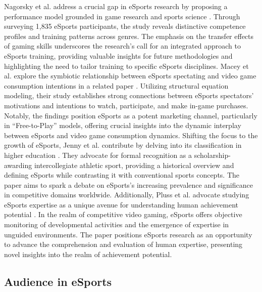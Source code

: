 \documentclass[manuscript,screen,review,anonymous]{acmart}
\begin{document}
Nagorsky et al. address a crucial gap in eSports research by proposing a performance model grounded in game research and sports science \cite{a14}. Through surveying 1,835 eSports participants, the study reveals distinctive competence profiles and training patterns across genres. The emphasis on the transfer effects of gaming skills underscores the research's call for an integrated approach to eSports training, providing valuable insights for future methodologies and highlighting the need to tailor training to specific eSports disciplines. Macey et al. explore the symbiotic relationship between eSports spectating and video game consumption intentions in a related paper \cite{a11}. Utilizing structural equation modeling, their study establishes strong connections between eSports spectators' motivations and intentions to watch, participate, and make in-game purchases. Notably, the findings position eSports as a potent marketing channel, particularly in ``Free-to-Play'' models, offering crucial insights into the dynamic interplay between eSports and video game consumption dynamics. Shifting the focus to the growth of eSports, Jenny et al. contribute by delving into its classification in higher education \cite{a6}. They advocate for formal recognition as a scholarship-awarding intercollegiate athletic sport, providing a historical overview and defining eSports while contrasting it with conventional sports concepts. The paper aims to spark a debate on eSports's increasing prevalence and significance in competitive domains worldwide. Additionally, Pluss et al. advocate studying eSports expertise as a unique avenue for understanding human achievement potential \cite{a17}. In the realm of competitive video gaming, eSports offers objective monitoring of developmental activities and the emergence of expertise in unguided environments. The paper positions eSports research as an opportunity to advance the comprehension and evaluation of human expertise, presenting novel insights into the realm of achievement potential.

\subsection{Audience in eSports}
\end{document}
